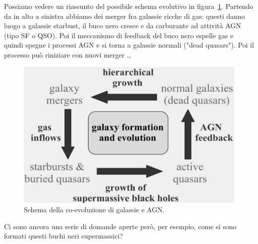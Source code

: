 Possiamo vedere un riassunto del possibile schema evolutivo in figura~\ref{fig:coevolution-galassie-agn}. Partendo da in alto a sinistra abbiamo dei merger fra galassie ricche di gas: questi danno luogo a galassie starbust, il buco nero cresce e da carburante ad attività AGN (tipo SF o QSO). Poi il meccanismo di feedback del buco nero espelle gas e quindi spegne i processi AGN e si torna a galassie normali ("dead quasars"). Poi il processo può riniziare con nuovi merger \dots

\begin{figure}
    \centering
    \includegraphics[width = 0.6 \textwidth]{immagini/coevolution-galassie-agn.png}
    \caption{Schema della co-evoluzione di galassie e AGN.}
    \label{fig:coevolution-galassie-agn}
\end{figure}

Ci sono ancora una serie di domande aperte però, per esempio, come si sono formati questi buchi neri supermassici?